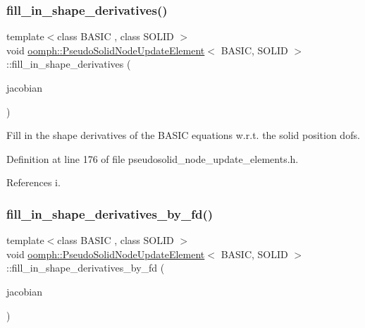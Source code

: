 \subsubsection{\texorpdfstring{fill\+\_\+in\+\_\+shape\+\_\+derivatives()}{fill\_in\_shape\_derivatives()}}
{\footnotesize\ttfamily template$<$class B\+A\+S\+IC , class S\+O\+L\+ID $>$ \\
void \hyperlink{classoomph_1_1PseudoSolidNodeUpdateElement}{oomph\+::\+Pseudo\+Solid\+Node\+Update\+Element}$<$ B\+A\+S\+IC, S\+O\+L\+ID $>$\+::fill\+\_\+in\+\_\+shape\+\_\+derivatives (\begin{DoxyParamCaption}\item[{\hyperlink{classoomph_1_1DenseMatrix}{Dense\+Matrix}$<$ double $>$ \&}]{jacobian }\end{DoxyParamCaption})\hspace{0.3cm}{\ttfamily [inline]}}



Fill in the shape derivatives of the B\+A\+S\+IC equations w.\+r.\+t. the solid position dofs. 



Definition at line 176 of file pseudosolid\+\_\+node\+\_\+update\+\_\+elements.\+h.



References i.

\mbox{\label{classoomph_1_1PseudoSolidNodeUpdateElement_a6f5600cb23d1e26816ae36ae8195c01e}} 
\subsubsection{\texorpdfstring{fill\+\_\+in\+\_\+shape\+\_\+derivatives\+\_\+by\+\_\+fd()}{fill\_in\_shape\_derivatives\_by\_fd()}}
{\footnotesize\ttfamily template$<$class B\+A\+S\+IC , class S\+O\+L\+ID $>$ \\
void \hyperlink{classoomph_1_1PseudoSolidNodeUpdateElement}{oomph\+::\+Pseudo\+Solid\+Node\+Update\+Element}$<$ B\+A\+S\+IC, S\+O\+L\+ID $>$\+::fill\+\_\+in\+\_\+shape\+\_\+derivatives\+\_\+by\+\_\+fd (\begin{DoxyParamCaption}\item[{\hyperlink{classoomph_1_1DenseMatrix}{Dense\+Matrix}$<$ double $>$ \&}]{jacobian }\end{DoxyParamCaption})\hspace{0.3cm}{\ttfamily [inline]}}



